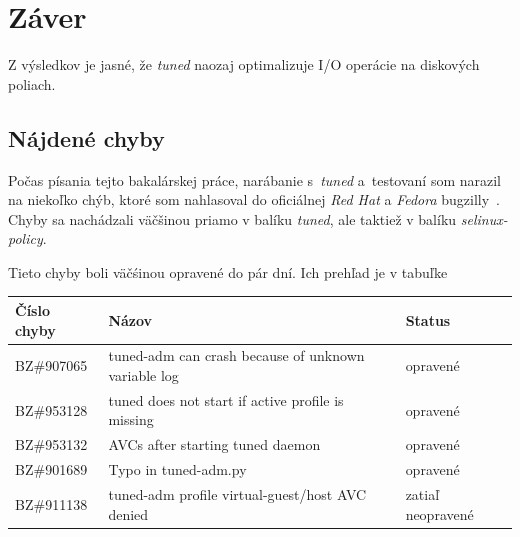 %
%

\chapter{Záver}

Z výsledkov je jasné, že \emph{tuned} naozaj optimalizuje I/O operácie na diskových poliach. 

%
%

\section{Nájdené chyby}

Počas písania tejto bakalárskej práce, narábanie s~\emph{tuned} a~testovaní som
narazil na niekoľko chýb, ktoré som nahlasoval do oficiálnej \emph{Red Hat} a
\emph{Fedora} bugzilly~\cite{rhBugzilla}. Chyby sa nachádzali väčšinou priamo v
balíku \emph{tuned}, ale taktiež v balíku \emph{selinux-policy}.

Tieto chyby boli väčśinou opravené do pár dní. Ich prehľad je v tabuľke %

\begin{center}
\begin{tabular}{|l|l|l|}
    \hline
    \textbf{Číslo chyby} & \textbf{Názov} & \textbf{Status} \\
    \hline
    BZ\#907065 & tuned-adm can crash because of unknown variable log & opravené \\
    BZ\#953128 & tuned does not start if active profile is missing & opravené \\
    BZ\#953132 & AVCs after starting tuned daemon & opravené \\
    BZ\#901689 & Typo in tuned-adm.py & opravené \\
    BZ\#911138 & tuned-adm profile virtual-guest/host AVC denied & zatiaľ neopravené \\
    \hline
\end{tabular}
\end{center}

